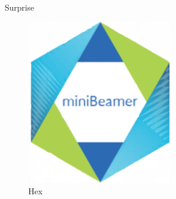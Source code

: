 \documentclass[ignorenonframetext,]{beamer}
\begin{document}
\begin{frame}{Surprise}

\begin{figure}
\centering
\includegraphics{logo_beamer.png}
\caption{Hex}
\end{figure}

\end{frame}

\end{document}
